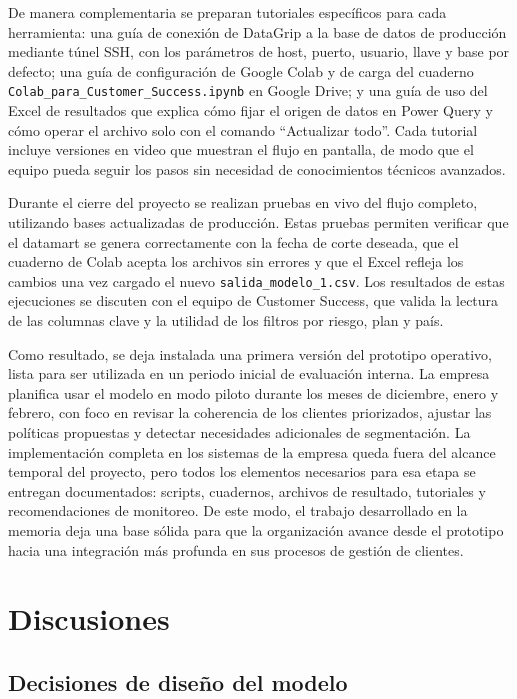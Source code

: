 De manera complementaria se preparan tutoriales específicos para cada herramienta: una guía de conexión de DataGrip a la base de datos de producción mediante túnel SSH, con los parámetros de host, puerto, usuario, llave y base por defecto; una guía de configuración de Google Colab y de carga del cuaderno \texttt{Colab\_para\_Customer\_Success.ipynb} en Google Drive; y una guía de uso del Excel de resultados que explica cómo fijar el origen de datos en Power Query y cómo operar el archivo solo con el comando “Actualizar todo”. Cada tutorial incluye versiones en video que muestran el flujo en pantalla, de modo que el equipo pueda seguir los pasos sin necesidad de conocimientos técnicos avanzados.

Durante el cierre del proyecto se realizan pruebas en vivo del flujo completo, utilizando bases actualizadas de producción. Estas pruebas permiten verificar que el datamart se genera correctamente con la fecha de corte deseada, que el cuaderno de Colab acepta los archivos sin errores y que el Excel refleja los cambios una vez cargado el nuevo \texttt{salida\_modelo\_1.csv}. Los resultados de estas ejecuciones se discuten con el equipo de Customer Success, que valida la lectura de las columnas clave y la utilidad de los filtros por riesgo, plan y país.

Como resultado, se deja instalada una primera versión del prototipo operativo, lista para ser utilizada en un periodo inicial de evaluación interna. La empresa planifica usar el modelo en modo piloto durante los meses de diciembre, enero y febrero, con foco en revisar la coherencia de los clientes priorizados, ajustar las políticas propuestas y detectar necesidades adicionales de segmentación. La implementación completa en los sistemas de la empresa queda fuera del alcance temporal del proyecto, pero todos los elementos necesarios para esa etapa se entregan documentados: scripts, cuadernos, archivos de resultado, tutoriales y recomendaciones de monitoreo. De este modo, el trabajo desarrollado en la memoria deja una base sólida para que la organización avance desde el prototipo hacia una integración más profunda en sus procesos de gestión de clientes.

\newpage

\section{Discusiones}

\subsection{Decisiones de diseño del modelo}

